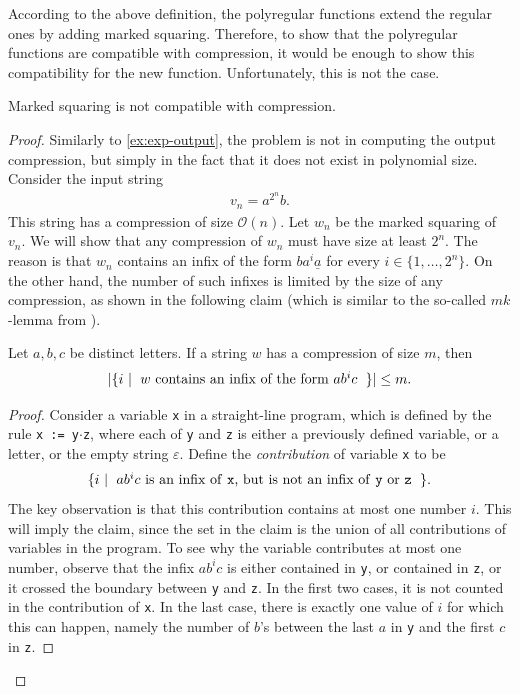 \documentclass[a4paper,UKenglish,cleveref, autoref, thm-restate]{lipics-v2021}
\newcommand{\set}[1]{\{#1\}}
\newcommand{\setbuild}[2]{\set{#1 \ | 
\begin{tabular}{l}
	#2
\end{tabular}}}
\begin{document}
\noindent
According to the above definition, the polyregular functions extend the regular ones by adding marked squaring. Therefore, to show that the polyregular functions are compatible with compression, it would be enough to show this compatibility for the new function. Unfortunately, this is not the case. 

\begin{lemma}\label{lem:nonblind-squaring}
    Marked squaring is not compatible with compression.
\end{lemma}

\begin{proof}
    Similarly to \cref{ex:exp-output}, the problem is not in computing the output compression, but simply in the fact that it does not exist in polynomial size. Consider the input string 
    \begin{align*}
    v_n = a^{2^n}b.
    \end{align*}
    This string has a compression of size $\mathcal{O}(n)$. Let $w_n$ be the marked squaring of $v_n$. We will show that 
    any compression of $w_n$ must have size at least $2^n$. The reason is that $w_n$ contains an infix of the form  $ba^i\underline a$ for every $i \in \set{1,\ldots,{2^n}}$. On the other hand, the number of such infixes is limited by the size of any compression, as shown in the following claim
    (which is similar to the so-called $mk$-lemma from \cite[Lemma~3]{CLLLPPSS05}).
    \begin{claim} \label{claim-infix}
        Let $a,b,c$ be distinct letters. If a string $w$ has a compression of size $m$, then 
        \begin{align*}
        |\setbuild{ i }{$w$ contains an infix of the form $ab^ic$}| \leq m.
        \end{align*}
    \end{claim}
    \begin{proof}
        Consider a variable \texttt{x} in a straight-line program,  which is defined by the  rule \texttt{x := y$\cdot$z}, where each of \texttt y and \texttt z is either a previously defined variable, or a letter, or the empty string $\varepsilon$.  Define the \emph{contribution} of variable \texttt{x} to be 
        \begin{align*}
        \setbuild{ i }{$ab^ic$ is an infix of \texttt x, but is not an infix of \texttt y or \texttt z}.
        \end{align*}
        The key observation is that this contribution contains at most one number $i$. This will imply the claim, since the set in the claim is the union of all contributions of variables in the program.  To see why the variable contributes at most one number, observe that the infix $ab^ic$ is either contained in \texttt y, or contained in \texttt z, or it crossed the boundary between \texttt y and \texttt z. In the first two cases, it is not counted in the contribution of \texttt x. In the last case, there is exactly one value of $i$ for which this can happen, namely the number of $b$'s between the last $a$ in \texttt y and the first $c$ in \texttt z.

\end{proof}
\end{proof}
\end{document}
